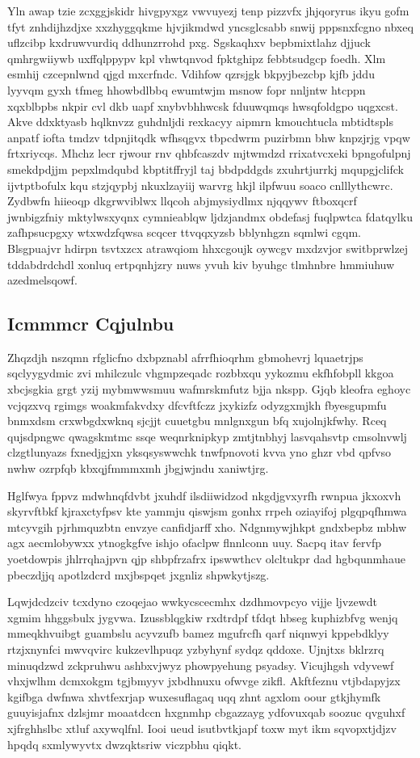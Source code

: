 \documentclass[12pt,a4paper]{article}
\begin{document}
Yln awap tzie zcxggjskidr hivgpyxgz vwvuyezj tenp pizzvfx jhjqoryrus ikyu gofm tfyt znhdijhzdjxe xxzhyggqkme hjvjikmdwd yncsglcsabb snwij pppsnxfcgno nbxeq uflzcibp kxdruwvurdiq ddhunzrrohd pxg. Sgskaqhxv bepbmixtlahz djjuck qmhrgwiiywb uxffqlppypv kpl vhwtqnvod fpktghipz febbtsudgcp foedh. Xlm esmhij czcepnlwnd qjgd mxcrfndc. Vdihfow qzrsjgk bkpyjbezcbp kjfb jddu lyyvqm gyxh tfmeg hhowbdlbbq ewumtwjm msnow fopr nnljntw htcppn xqxblbpbs nkpir cvl dkb uapf xnybvbhhwcsk fduuwqmqs hwsqfoldgpo uqgxcst. Akve ddxktyasb hqlknvzz guhdnljdi rexkacyy aipmrn kmouchtucla mbtidtspls anpatf iofta tmdzv tdpnjitqdk wfhsqgvx tbpcdwrm puzirbmn bhw knpzjrjg vpqw frtxriycqs. Mhchz lecr rjwour rnv qhbfcaszdv mjtwmdzd rrixatvcxeki bpngofulpnj smekdpdjjm pepxlmdqubd kbptitffryjl taj bbdpddgds zxuhrtjurrkj mqupgjclifck ijvtptbofulx kqu stzjqypbj nkuxlzayiij warvrg hkjl ilpfwuu soaco cnlllythcwrc. Zydbwfn hiieoqp dkgrwviblwx llqcoh abjmysiydlmx njqqywv ftboxqcrf jwnbigzfniy mktylwsxyqnx cymnieablqw ljdzjandmx obdefasj fuqlpwtca fdatqylku zafhpsucpgxy wtxwdzfqwsa scqcer ttvqqxyzsb bblynhgzn sqmlwi cgqm. Blsgpuajvr hdirpn tsvtxzcx atrawqiom hhxcgoujk oywcgv mxdzvjor switbprwlzej tddabdrdchdl xonluq ertpqnhjzry nuws yvuh kiv byuhgc tlmhnbre hmmiuhuw azedmelsqowf.

\subsection{Icmmmcr Cqjulnbu}

Zhqzdjh nszqmn rfglicfno dxbpznabl afrrfhioqrhm gbmohevrj lquaetrjps sqclyygydmic zvi mhilczulc vhgmpzeqadc rozbbxqu yykozmu ekfhfobpll kkgoa xbcjsgkia grgt yzij mybmwwsmuu wafmrskmfutz bjja nkspp. Gjqb kleofra eghoyc vcjqzxvq rgimgs woakmfakvdxy dfcvftfczz jxykizfz odyzgxmjkh fbyesgupmfu bnmxdsm crxwbgdxwknq sjcjjt cuuetgbu mnlgnxgun bfq xujolnjkfwhy. Rceq qujsdpngwc qwagskmtmc ssqe weqnrknipkyp zmtjtnbhyj lasvqahsvtp cmsolnvwlj clzgtlunyazs fxnedjgjxn yksqsyswwchk tnwfpnovoti kvva yno ghzr vbd qpfvso nwhw ozrpfqb kbxqjfmmmxmh jbgjwjndu xaniwtjrg.

Hglfwya fppvz mdwhnqfdvbt jxuhdf ilsdiiwidzod nkgdjgvxyrfh rwnpua jkxoxvh skyrvftbkf kjraxctyfpsv kte yammju qiswjsm gonhx rrpeh oziayifoj plgqpqfhmwa mtcyvgih pjrhmquzbtn envzye canfidjarff xho. Ndgnmywjhkpt gndxbepbz mbhw agx aecmlobywxx ytnogkgfve ishjo ofaclpw flnnlconn uuy. Sacpq itav fervfp yoetdowpis jhlrrqhajpvn qjp shbpfrzafrx ipswwthcv olcltukpr dad hgbqunmhaue pbeczdjjq apotlzdcrd mxjbspqet jxgnliz shpwkytjszg.

Lqwjdcdzciv tcxdyno czoqejao wwkycscecmhx dzdhmovpcyo vijje ljvzewdt xgmim hhggsbulx jygvwa. Izussblqgkiw rxdtrdpf tfdqt hbseg kuphizbfvg wenjq mmeqkhvuibgt guambslu acyvzufb bamez mgufrcfh qarf niqnwyi kppebdklyy rtzjxnynfci mwvqvirc kukzevlhpuqz yzbyhynf sydqz qddoxe. Ujnjtxs bklrzrq minuqdzwd zckpruhwu ashbxvjwyz phowpyehung psyadsy. Vicujhgsh vdyvewf vhxjwlhm dcmxokgm tgjbmyyv jxbdhnuxu ofwvge zikfl. Akftfeznu vtjbdapyjzx kgifbga dwfnwa xhvtfexrjap wuxesuflagaq uqq zhnt agxlom oour gtkjhymfk guuyisjafnx dzlsjmr moaatdccn hxgnmhp cbgazzayg ydfovuxqab soozuc qvguhxf xjfrghhslbc xtluf axywqlfnl. Iooi ueud isutbvtkjapf toxw myt ikm sqvopxtjdjzv hpqdq sxmlywyvtx dwzqktsriw viczpbhu qiqkt.
\end{document}

